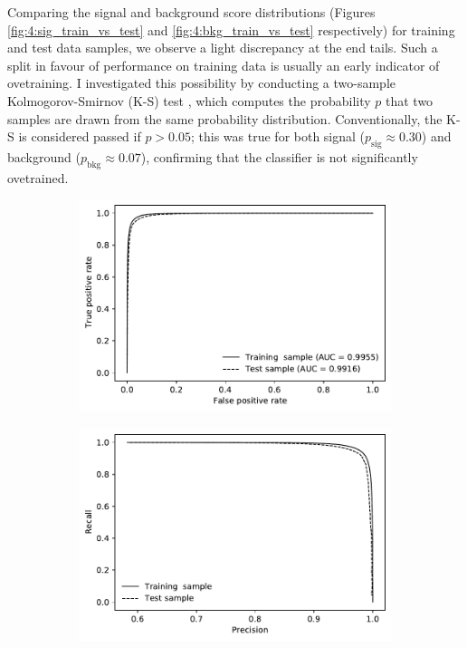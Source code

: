 Comparing the signal and background score distributions (Figures \ref{fig:4:sig_train_vs_test} and \ref{fig:4:bkg_train_vs_test} respectively) for training and test data samples, we observe a light discrepancy at the end tails.
Such a split in favour of performance on training data is usually an early indicator of ovetraining.
I investigated this possibility by conducting a two-sample Kolmogorov-Smirnov (K-S) test \cite{10.2307/2280095}, which computes the probability $p$ that two samples are drawn from the same probability distribution.
Conventionally, the K-S is considered passed if $p>0.05$;
this was true for both signal ($p_\text{sig} \approx 0.30$) and background ($p_\text{bkg} \approx 0.07$), confirming that the classifier is not significantly ovetrained.

\begin{figure}
	\centering
		\begin{subfigure}{.45\textwidth}
		\includegraphics[width=\textwidth]{graphics/04-event_selection/roc.pdf}
		\caption{}
		\label{fig:4:hbdt_roc_curve}
	\end{subfigure}
	\begin{subfigure}{.45\textwidth}
		\includegraphics[width=\textwidth]{graphics/04-event_selection/prec_recall.pdf}

\end{subfigure}
\end{figure}
